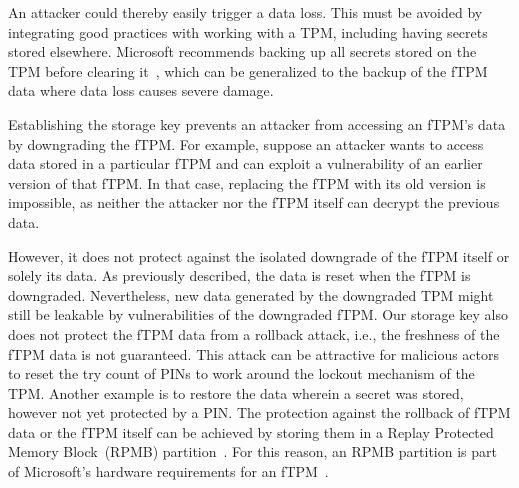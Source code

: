 

An attacker could thereby easily trigger a data loss.
This must be avoided by integrating good practices with working with a \ac{TPM}, including having secrets stored elsewhere.
Microsoft recommends backing up all secrets stored on the \ac{TPM} before clearing it~\cite{MicrosoftClearRecommendations}, which can be generalized to the backup of the fTPM data where data loss causes severe damage.


Establishing the storage key prevents an attacker from accessing an fTPM's data by downgrading the \ac{fTPM}\@.
For example, suppose an attacker wants to access data stored in a particular \ac{fTPM} and can exploit a vulnerability of an earlier version of that \ac{fTPM}\@.
In that case, replacing the \ac{fTPM} with its old version is impossible, as neither the attacker nor the \ac{fTPM} itself can decrypt the previous data.

However, it does not protect against the isolated downgrade of the \ac{fTPM} itself or solely its data.
As previously described, the data is reset when the \ac{fTPM} is downgraded.
Nevertheless, new data generated by the downgraded TPM might still be leakable by vulnerabilities of the downgraded \ac{fTPM}\@.
Our storage key also does not protect the \ac{fTPM} data from a rollback attack, i.e., the freshness of the \ac{fTPM} data is not guaranteed.
This attack can be attractive for malicious actors to reset the try count of PINs to work around the lockout mechanism of the \ac{TPM}\@.
Another example is to restore the data wherein a secret was stored, however not yet protected by a PIN\@.
The protection against the rollback of \ac{fTPM} data or the \ac{fTPM} itself can be achieved by storing them in a Replay Protected Memory Block~(RPMB) partition~\cite{eMMC, UFS}.
For this reason, an RPMB partition is part of Microsoft's hardware requirements for an \ac{fTPM}~\cite{Raj2015}.

